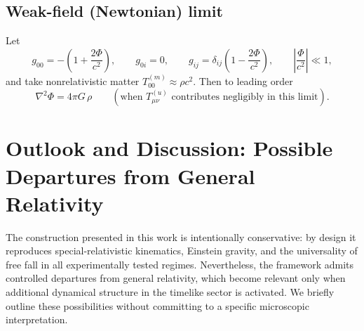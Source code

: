 \documentclass[11pt]{article}
\begin{document}
        \subsection{Weak-field (Newtonian) limit}
            Let
            \begin{equation}
                g_{00} = -\left(1+\frac{2\Phi}{c^2}\right),\qquad
                g_{0i}=0,\qquad
                g_{ij}=\delta_{ij}\left(1-\frac{2\Phi}{c^2}\right),
                \qquad
                \left|\frac{\Phi}{c^2}\right|\ll 1,
            \end{equation}
            and take nonrelativistic matter $T^{(m)}_{00}\approx \rho c^2$.
            Then to leading order
            \begin{equation}
                \nabla^2 \Phi = 4\pi G\,\rho
                \qquad (\text{when }T^{(u)}_{\mu\nu}\text{ contributes negligibly in this limit}).
            \end{equation}

    \section{Outlook and Discussion: Possible Departures from General Relativity}
        \label{sec:outlook}

        The construction presented in this work is intentionally conservative: by
        design it reproduces special-relativistic kinematics, Einstein gravity, and the
        universality of free fall in all experimentally tested regimes.
        Nevertheless, the framework admits controlled departures from general
        relativity, which become relevant only when additional dynamical structure in
        the timelike sector is activated.
        We briefly outline these possibilities without committing to a specific
        microscopic interpretation.
\end{document}
